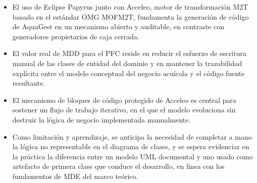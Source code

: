 \documentclass[11pt,a4paper]{article}
\begin{document}
\begin{itemize}[nosep]
  \item El uso de Eclipse Papyrus junto con Acceleo, motor de transformación M2T basado en el
        estándar OMG MOFM2T, fundamenta la generación de código de AquaGest en un mecanismo
        abierto y auditable, en contraste con generadores propietarios de caja cerrada.
  \item El valor real de MDD para el PFC reside en reducir el esfuerzo de escritura manual de las
        clases de entidad del dominio y en mantener la trazabilidad explícita entre el modelo
        conceptual del negocio acuícola y el código fuente resultante.
  \item El mecanismo de bloques de código protegido de Acceleo es central para sostener un flujo de
        trabajo iterativo, en el que el modelo evoluciona sin destruir la lógica de negocio
        implementada manualmente.
  \item Como limitación y aprendizaje, se anticipa la necesidad de completar a mano la lógica no
        representable en el diagrama de clases, y se espera evidenciar en la práctica la diferencia
        entre un modelo UML documental y uno usado como artefacto de primera clase que conduce el
        desarrollo, en línea con los fundamentos de MDE del marco teórico.
\end{itemize}


\newpage


\end{document}
